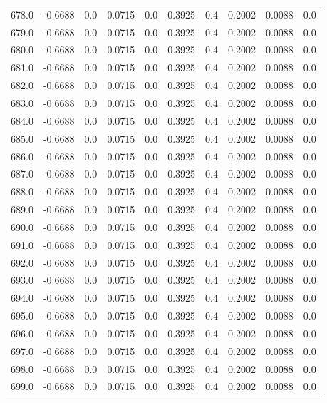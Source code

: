 \begin{longtable}{lrrrrrrrrr}
678.0 & -0.6688 & 0.0 & 0.0715 & 0.0 & 0.3925 & 0.4 & 0.2002 & 0.0088 & 0.0 \\
679.0 & -0.6688 & 0.0 & 0.0715 & 0.0 & 0.3925 & 0.4 & 0.2002 & 0.0088 & 0.0 \\
680.0 & -0.6688 & 0.0 & 0.0715 & 0.0 & 0.3925 & 0.4 & 0.2002 & 0.0088 & 0.0 \\
681.0 & -0.6688 & 0.0 & 0.0715 & 0.0 & 0.3925 & 0.4 & 0.2002 & 0.0088 & 0.0 \\
682.0 & -0.6688 & 0.0 & 0.0715 & 0.0 & 0.3925 & 0.4 & 0.2002 & 0.0088 & 0.0 \\
683.0 & -0.6688 & 0.0 & 0.0715 & 0.0 & 0.3925 & 0.4 & 0.2002 & 0.0088 & 0.0 \\
684.0 & -0.6688 & 0.0 & 0.0715 & 0.0 & 0.3925 & 0.4 & 0.2002 & 0.0088 & 0.0 \\
685.0 & -0.6688 & 0.0 & 0.0715 & 0.0 & 0.3925 & 0.4 & 0.2002 & 0.0088 & 0.0 \\
686.0 & -0.6688 & 0.0 & 0.0715 & 0.0 & 0.3925 & 0.4 & 0.2002 & 0.0088 & 0.0 \\
687.0 & -0.6688 & 0.0 & 0.0715 & 0.0 & 0.3925 & 0.4 & 0.2002 & 0.0088 & 0.0 \\
688.0 & -0.6688 & 0.0 & 0.0715 & 0.0 & 0.3925 & 0.4 & 0.2002 & 0.0088 & 0.0 \\
689.0 & -0.6688 & 0.0 & 0.0715 & 0.0 & 0.3925 & 0.4 & 0.2002 & 0.0088 & 0.0 \\
690.0 & -0.6688 & 0.0 & 0.0715 & 0.0 & 0.3925 & 0.4 & 0.2002 & 0.0088 & 0.0 \\
691.0 & -0.6688 & 0.0 & 0.0715 & 0.0 & 0.3925 & 0.4 & 0.2002 & 0.0088 & 0.0 \\
692.0 & -0.6688 & 0.0 & 0.0715 & 0.0 & 0.3925 & 0.4 & 0.2002 & 0.0088 & 0.0 \\
693.0 & -0.6688 & 0.0 & 0.0715 & 0.0 & 0.3925 & 0.4 & 0.2002 & 0.0088 & 0.0 \\
694.0 & -0.6688 & 0.0 & 0.0715 & 0.0 & 0.3925 & 0.4 & 0.2002 & 0.0088 & 0.0 \\
695.0 & -0.6688 & 0.0 & 0.0715 & 0.0 & 0.3925 & 0.4 & 0.2002 & 0.0088 & 0.0 \\
696.0 & -0.6688 & 0.0 & 0.0715 & 0.0 & 0.3925 & 0.4 & 0.2002 & 0.0088 & 0.0 \\
697.0 & -0.6688 & 0.0 & 0.0715 & 0.0 & 0.3925 & 0.4 & 0.2002 & 0.0088 & 0.0 \\
698.0 & -0.6688 & 0.0 & 0.0715 & 0.0 & 0.3925 & 0.4 & 0.2002 & 0.0088 & 0.0 \\
699.0 & -0.6688 & 0.0 & 0.0715 & 0.0 & 0.3925 & 0.4 & 0.2002 & 0.0088 & 0.0 \\

\end{longtable}
